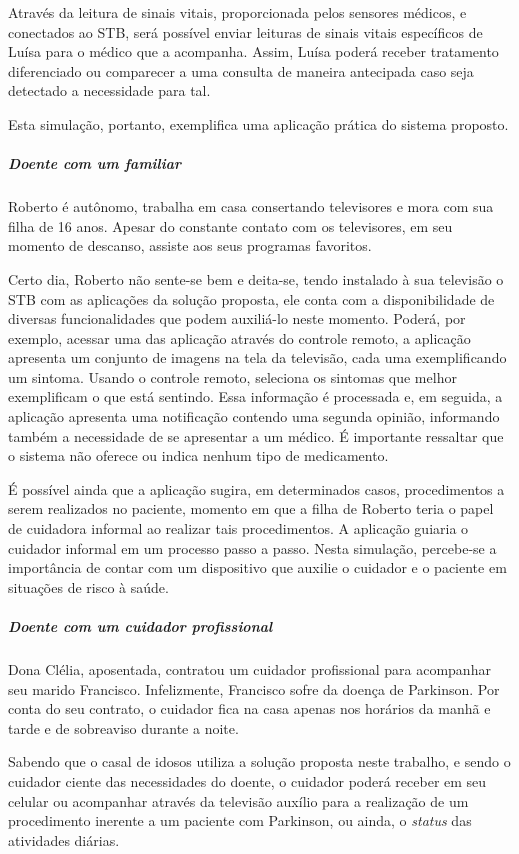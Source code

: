 Através da leitura de sinais vitais, proporcionada pelos sensores médicos,
e conectados ao STB, será possível enviar leituras de sinais vitais específicos 
de Luísa para o médico que a acompanha. Assim, Luísa poderá receber tratamento
diferenciado ou comparecer a uma consulta de maneira antecipada caso seja
detectado a necessidade para tal.

Esta simulação, portanto, exemplifica uma aplicação prática do sistema 
proposto.

\subparagraph{Doente com um familiar}

Roberto é autônomo, trabalha em casa consertando televisores e mora com sua
filha de 16 anos. Apesar do constante contato com os televisores, em seu momento
de descanso, assiste aos seus programas favoritos.

Certo dia, Roberto não sente-se bem e deita-se, tendo instalado à sua televisão
o STB com as aplicações da solução proposta, ele conta com a disponibilidade de
diversas funcionalidades que podem auxiliá-lo neste momento. Poderá, por
exemplo, acessar uma das aplicação através do controle remoto, a aplicação
apresenta um conjunto de imagens na tela da televisão, cada uma exemplificando
um sintoma.  Usando o controle remoto, seleciona os sintomas que melhor
exemplificam o que está sentindo. Essa informação é processada e, em seguida, a
aplicação apresenta uma notificação contendo uma segunda opinião, informando
também a necessidade de se apresentar a um médico. É importante ressaltar que
o sistema não oferece ou indica nenhum tipo de medicamento.

É possível ainda que a aplicação sugira, em determinados casos, procedimentos a
serem realizados no paciente, momento em que a filha de Roberto teria o papel de
cuidadora informal ao realizar tais procedimentos. A aplicação guiaria o
cuidador informal em um processo passo a passo. Nesta simulação,  percebe-se a
importância de contar com um dispositivo que auxilie o cuidador e o paciente em
situações de risco à saúde.

\subparagraph{Doente com um cuidador profissional}

Dona Clélia, aposentada, contratou um cuidador profissional para acompanhar seu
marido Francisco. Infelizmente, Francisco sofre da doença de Parkinson. Por conta
do seu contrato, o cuidador fica na casa apenas nos horários da manhã e tarde e 
de sobreaviso durante a noite.

Sabendo que o casal de idosos utiliza a solução proposta neste trabalho, e sendo o
cuidador ciente das necessidades do doente, o cuidador poderá receber em seu celular ou
acompanhar através da televisão auxílio para a realização de um procedimento inerente
a um paciente com Parkinson, ou ainda, o \textit{status} das atividades diárias.

